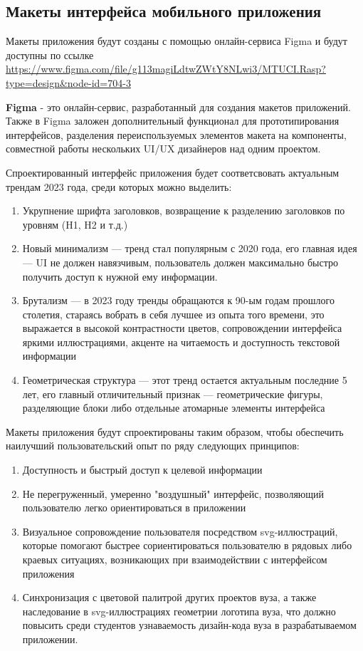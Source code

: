 \subsection{Макеты интерфейса мобильного приложения}
Макеты приложения будут созданы с помощью онлайн-сервиса Figma
и будут доступны по ссылке \url{https://www.figma.com/file/g113magiLdtwZWtY8NLwi3/MTUCI.Rasp?type=design&node-id=704-3}

\textbf{Figma} - это онлайн-сервис, разработанный для создания макетов приложений.
Также в Figma заложен дополнительный функционал для прототипирования интерфейсов,
разделения переиспользуемых элементов макета на компоненты,
совместной работы нескольких UI/UX дизайнеров над одним проектом.

Спроектированный интерфейс приложения будет соответсвовать актуальным трендам 2023 года,
среди которых можно выделить:
\begin{enumerate}
  \item Укрупнение шрифта заголовков, возвращение к разделению заголовков по уровням (H1, H2 и т.д.)
  \item Новый минимализм — тренд стал популярным с 2020 года, его главная идея — UI не должен навязчивым, пользователь должен максимально быстро получить доступ к нужной ему информации.
  \item Брутализм — в 2023 году тренды обращаются к 90-ым годам прошлого столетия, стараясь вобрать в себя лучшее из опыта того времени, это выражается в высокой контрастности цветов, сопровождении интерфейса яркими иллюстрациями, акценте на читаемость и доступность текстовой информации
  \item Геометрическая структура — этот тренд остается актуальным последние 5 лет, его главный отличительный признак — геометрические фигуры, разделяющие блоки либо отдельные атомарные элементы интерфейса
\end{enumerate}

Макеты приложения будут спроектированы таким образом, чтобы обеспечить наилучший пользовательский опыт по ряду следующих принципов:
\begin{enumerate}
  \item Доступность и быстрый доступ к целевой информации
  \item Не перегруженный, умеренно "воздушный" интерфейс, позволяющий пользователю легко ориентироваться в приложении
  \item Визуальное сопровождение пользователя посредством svg-иллюстраций, которые помогают быстрее сориентироваться пользователю в рядовых либо краевых ситуациях, возникающих при взаимодействии с интерфейсом приложения
  \item Синхронизация с цветовой палитрой других проектов вуза, а также наследование в svg-иллюстрациях геометрии логотипа вуза, что должно повысить среди студентов узнаваемость дизайн-кода вуза в разрабатываемом приложении.
\end{enumerate}


